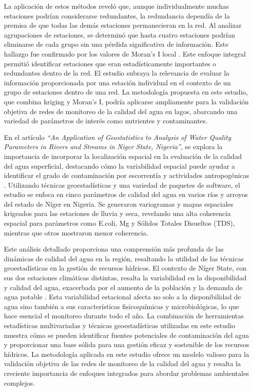 La aplicación de estos métodos reveló que, aunque individualmente muchas estaciones podrían considerarse redundantes, la redundancia dependía de la premisa de que todas las demás estaciones permanecieran en la red. Al analizar agrupaciones de estaciones, se determinó que hasta cuatro estaciones podrían eliminarse de cada grupo sin una pérdida significativa de información. Este hallazgo fue confirmado por los valores de Moran's I local \cite{Beveridge2012}. Este enfoque integral permitió identificar estaciones que eran estadísticamente importantes o redundantes dentro de la red. El estudio subraya la relevancia de evaluar la información proporcionada por una estación individual en el contexto de un grupo de estaciones dentro de una red. La metodología propuesta en este estudio, que combina kriging y Moran's I, podría aplicarse ampliamente para la validación objetiva de redes de monitoreo de la calidad del agua en lagos, abarcando una variedad de parámetros de interés como nutrientes y contaminantes.

En el artículo \textit{``An Application of Geostatistics to Analysis of Water Quality Parameters in Rivers and Streams in Niger State, Nigeria''}, se explora la importancia de incorporar la localización espacial en la evaluación de la calidad del agua superficial, destacando cómo la variabilidad espacial puede ayudar a identificar el grado de contaminación por escorrentía y actividades antropogénicas \cite{Audu2015}. Utilizando técnicas geoestadísticas y una variedad de paquetes de software, el estudio se enfoca en cinco parámetros de calidad del agua en varios ríos y arroyos del estado de Níger en Nigeria. Se generaron variogramas y mapas espaciales krigeados para las estaciones de lluvia y seca, revelando una alta coherencia espacial para parámetros como E.coli, Mg y Sólidos Totales Disueltos (TDS), mientras que otros mostraron menor coherencia.

Este análisis detallado proporciona una comprensión más profunda de las dinámicas de calidad del agua en la región, resaltando la utilidad de las técnicas geoestadísticas en la gestión de recursos hídricos. El contexto de Níger State, con sus dos estaciones climáticas distintas, resalta la variabilidad en la disponibilidad y calidad del agua, exacerbada por el aumento de la población y la demanda de agua potable \cite{Audu2015}. Esta variabilidad estacional afecta no solo a la disponibilidad de agua sino también a sus características fisicoquímicas y microbiológicas, lo que hace esencial el monitoreo durante todo el año. La combinación de herramientas estadísticas multivariadas y técnicas geoestadísticas utilizadas en este estudio muestra cómo se pueden identificar fuentes potenciales de contaminación del agua y proporcionar una base sólida para una gestión eficaz y sostenible de los recursos hídricos. La metodología aplicada en este estudio ofrece un modelo valioso para la validación objetiva de las redes de monitoreo de la calidad del agua y resalta la creciente importancia de enfoques integrados para abordar problemas ambientales complejos.

